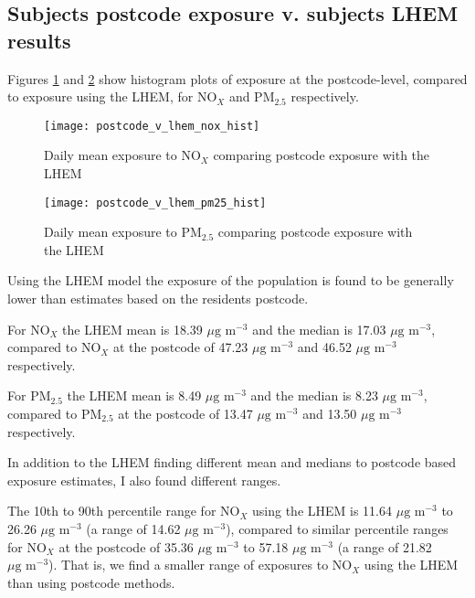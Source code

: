\subsection{Subjects postcode exposure v. subjects LHEM results}
\label{subsec:postcode_v_lhem}

Figures \ref{fig:postcode_v_lhem_nox_hist} and \ref{fig:postcode_v_lhem_pm25_hist} show histogram plots of exposure at the postcode-level, compared to exposure using the LHEM, for NO$_{X}$ and PM$_{2.5}$ respectively.

\begin{figure}[H]
\centering
\texttt{[image: postcode\_v\_lhem\_nox\_hist]}
\caption{Daily mean exposure to NO$_{X}$ comparing postcode exposure with the LHEM}
\label{fig:postcode_v_lhem_nox_hist}
\end{figure}

\begin{figure}[H]
\centering
\texttt{[image: postcode\_v\_lhem\_pm25\_hist]}
\caption{Daily mean exposure to PM$_{2.5}$ comparing postcode exposure with the LHEM}
\label{fig:postcode_v_lhem_pm25_hist}
\end{figure}

Using the LHEM model the exposure of the population is found to be generally lower than estimates based on the residents postcode.

For NO$_{X}$ the LHEM mean is 18.39 $\mu \text{g m}^{-3}$ and the median is 17.03 $\mu \text{g m}^{-3}$, compared to NO$_{X}$ at the postcode of 47.23 $\mu \text{g m}^{-3}$ and 46.52 $\mu \text{g m}^{-3}$ respectively.

For PM$_{2.5}$ the LHEM mean is 8.49 $\mu \text{g m}^{-3}$ and the median is 8.23 $\mu \text{g m}^{-3}$, compared to PM$_{2.5}$ at the postcode of 13.47 $\mu \text{g m}^{-3}$ and 13.50 $\mu \text{g m}^{-3}$ respectively.

In addition to the LHEM finding different mean and medians to postcode based exposure estimates, I also found different ranges.

The 10th to 90th percentile range for NO$_{X}$ using the LHEM is 11.64 $\mu \text{g m}^{-3}$ to 26.26 $\mu \text{g m}^{-3}$ (a range of 14.62 $\mu \text{g m}^{-3}$), compared to similar percentile ranges for NO$_{X}$ at the postcode of 35.36 $\mu \text{g m}^{-3}$ to 57.18 $\mu \text{g m}^{-3}$ (a range of 21.82 $\mu \text{g m}^{-3}$). That is, we find a smaller range of exposures to NO$_{X}$ using the LHEM than using postcode methods.

